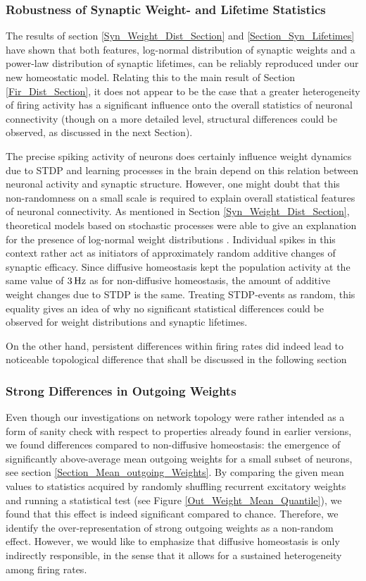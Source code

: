 \documentclass[10pt,a4paper]{article}
\begin{document}
\subsubsection{Robustness of Synaptic Weight- and Lifetime Statistics}
The results of section \ref{Syn_Weight_Dist_Section} and \ref{Section_Syn_Lifetimes} have shown that both features, log-normal distribution of synaptic weights and a power-law distribution of synaptic lifetimes, can be reliably reproduced under our new homeostatic model. Relating this to the main result of Section \ref{Fir_Dist_Section}, it does not appear to be the case that a greater heterogeneity of firing activity has a significant influence onto the overall statistics of neuronal connectivity (though on a more detailed level, structural differences could be observed, as discussed in the next Section).

The precise spiking activity of neurons does certainly influence weight dynamics due to STDP and learning processes in the brain depend on this relation between neuronal activity and synaptic structure. However, one might doubt that this non-randomness on a small scale is required to explain overall statistical features of neuronal connectivity. As mentioned in Section \ref{Syn_Weight_Dist_Section}, theoretical models based on stochastic processes were able to give an explanation for the presence of log-normal weight distributions \cite{Loewenstein_Spine_Sizes,Statman_Synapses_2014}. Individual spikes in this context rather act as initiators of approximately random additive changes of synaptic efficacy. Since diffusive homeostasis kept the population activity at the same value of $\rm 3\, Hz$ as for non-diffusive homeostasis, the amount of additive weight changes due to STDP is the same. Treating STDP-events as random, this equality gives an idea of why no significant statistical differences could be observed for weight distributions and synaptic lifetimes.

On the other hand, persistent differences within firing rates did indeed lead to noticeable topological difference that shall be discussed in the following section

\subsubsection{Strong Differences in Outgoing Weights}
Even though our investigations on network topology were rather intended as a form of sanity check with respect to properties already found in earlier versions, we found differences compared to non-diffusive homeostasis:
the emergence of significantly above-average mean outgoing weights for a small subset of neurons, see section \ref{Section_Mean_outgoing_Weights}. By comparing the given mean values to statistics acquired by randomly shuffling recurrent excitatory weights and running a statistical test (see Figure \ref{Out_Weight_Mean_Quantile}), we found that this effect is indeed significant compared to chance. Therefore, we identify the over-representation of strong outgoing weights as a non-random effect. However, we would like to emphasize that diffusive homeostasis is only indirectly responsible, in the sense that it allows for a sustained heterogeneity among firing rates.   
\end{document}
